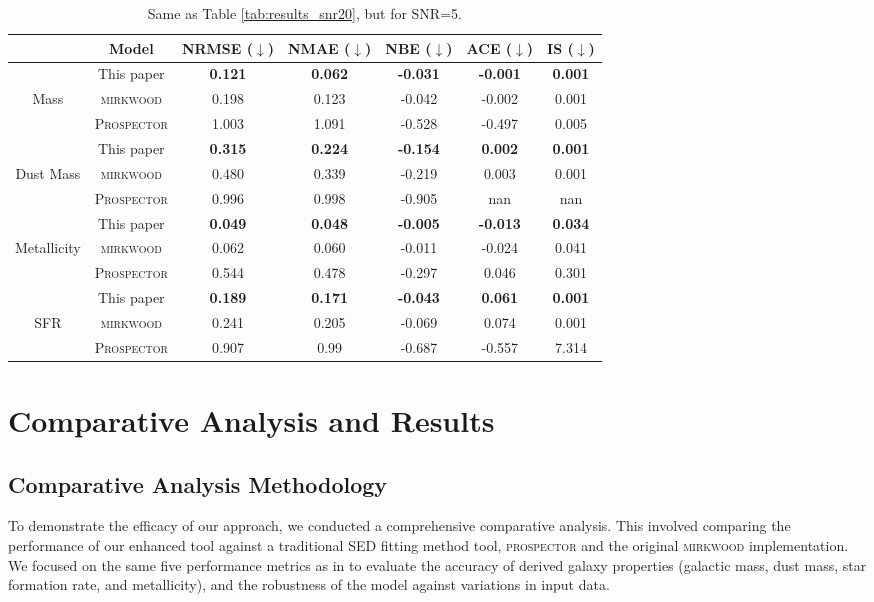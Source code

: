 \documentclass[letterpaper]{article} %
\begin{document}
\begin{table*}
\centering
\begin{tabular}{ccccccc}
\toprule
\toprule
& Model &  NRMSE ($\downarrow$) & NMAE ($\downarrow$) & NBE ($\downarrow$) & ACE ($\downarrow$) & IS ($\downarrow$) \\ \midrule
& This paper  &  \textbf{0.121}&  \textbf{0.062}&  \textbf{-0.031}&  \textbf{-0.001}&  \textbf{0.001} \\
Mass & \textsc{mirkwood} &    0.198 &  0.123 &  -0.042 &  -0.002&  0.001 \\
& \textsc{Prospector} &  1.003 &  1.091 &  -0.528 &   -0.497  &  0.005 \\ \midrule
& This paper  &    \textbf{0.315}&   \textbf{0.224}&  \textbf{-0.154}&   \textbf{0.002}&  \textbf{0.001}\\
Dust Mass & \textsc{mirkwood} &  0.480&  0.339 &  -0.219 &  0.003 & 0.001 \\
& \textsc{Prospector} &  0.996 &  0.998 & -0.905 &  nan &  nan \\ \midrule
& This paper&  \textbf{0.049}&   \textbf{0.048}&  \textbf{-0.005}&  \textbf{-0.013}&  \textbf{0.034}\\
Metallicity & \textsc{mirkwood}&  0.062&  0.060&   -0.011&  -0.024&  0.041\\
& \textsc{Prospector}&  0.544&  0.478&   -0.297&  0.046&  0.301\\ \midrule
& This paper&  \textbf{0.189}&   \textbf{0.171}&  \textbf{-0.043}&  \textbf{0.061}&  \textbf{0.001}\\
SFR & \textsc{mirkwood}&   0.241&  0.205&   -0.069&  0.074&  0.001\\
& \textsc{Prospector}&  0.907&  0.99&   -0.687&  -0.557&    7.314\\ \bottomrule
\end{tabular}
\caption{Same as Table \ref{tab:results_snr20}, but for SNR=5.}
\label{tab:results_snr5}
\end{table*}


\section{Comparative Analysis and Results}

\subsection{Comparative Analysis Methodology}
To demonstrate the efficacy of our approach, we conducted a comprehensive comparative analysis. This involved comparing the performance of our enhanced tool against a traditional SED fitting method tool, \textsc{prospector} \cite{2019ascl.soft05025J} and the original \textsc{mirkwood} implementation. We focused on the same five performance metrics as in \citet{Gilda21} to evaluate the accuracy of derived galaxy properties (galactic mass, dust mass, star formation rate, and metallicity), and the robustness of the model against variations in input data.
\end{document}
